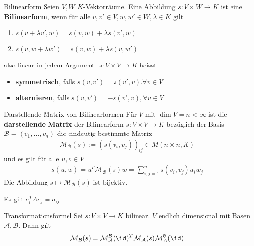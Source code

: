 \begin{definition}{Bilinearform}
    Seien $V,W$ $K$-Vektorräume. Eine Abbildung $s: V \times W \to K$ ist eine \textbf{Bilinearform}, wenn für alle $v,v' \in V, w,w' \in W, \lambda \in K$ gilt
    \begin{enumerate}
        \item   $s(v+ \lambda v',w) = s(v,w) + \lambda s(v',w)$
        \item   $s(v, w + \lambda w') = s(v,w) + \lambda s(v,w')$
    \end{enumerate}
    also linear in jedem Argument.
    $s: V \times V \to K$ heisst 
    \begin{itemize}
        \item   \textbf{symmetrisch}, falls $s(v,v') = s(v',v). \forall v \in V$
        \item   \textbf{alternieren}, falls $s(v,v') = -s(v',v), \forall v \in V$
    \end{itemize}
\end{definition}

\begin{definition}{Darstellende Matrix von Bilinearformen}
    Für $V$ mit $\dim V = n < \infty$ ist die \textbf{darstellende Matrix} der Bilinearform $s: V \times V \to K$ bezüglich der Basis $\mathcal{B} = (v_{1}, \ldots, v_{n})$ die eindeutig bestimmte Matrix 
    \begin{align*}
        \mathcal{M}_{\mathcal{B}}(s) := \left(s(v_i,v_j)\right)_{ij} \in M(n\times n,K)
    \end{align*}
    und es gilt für alle $u,v \in V$
    \begin{align*}
        s(u,w) = u^T \mathcal{M}_{\mathcal{B}}(s)w = \sum_{i,j = 1}^{n} s(v_i,v_j)u_iw_j
    \end{align*}
    Die Abbildung $s \mapsto \mathcal{M}_{\mathcal{B}}(s)$ ist bijektiv.
\end{definition}
Es gilt $e_i^T A e_j = a_{ij}$

\begin{satz}{Transformationsformel}
    Sei $s: V \times V \to K$ bilinear. $V$ endlich dimensional mit Basen $\mathcal{A}, \mathcal{B}$. Dann gilt 
    \begin{align*}
        \mathcal{M}_{\mathcal{B}}(s) = \mathcal{M}_{\mathcal{A}}^{\mathcal{B}}(\id)^T \mathcal{M}_{\mathcal{A}}(s) \mathcal{M}_{\mathcal{A}}^{\mathcal{B}}(\id)
    \end{align*}
\end{satz}

